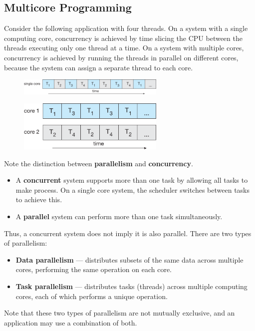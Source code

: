 \documentclass{article}
\begin{document}
\subsection{Multicore Programming}
Consider the following application with four threads. On a system with
a single computing core, concurrency is achieved by time slicing the
CPU between the threads executing only one thread at a time. On a
system with multiple cores, concurrency is achieved by running the
threads in parallel on different cores, because the system can assign a
separate thread to each core.
\begin{figure}[H]
    \centering
    \includegraphics[width = 7cm]{figures/threads_single_core.pdf}
\end{figure}
\begin{figure}[H]
    \centering
    \includegraphics[width = 7cm]{figures/threads_multi_core.pdf}
\end{figure}
Note the distinction between \textbf{parallelism} and \textbf{concurrency}.
\begin{itemize}
    \item A \textbf{concurrent} system supports more than one task by
          allowing all tasks to make process. On a single core system,
          the scheduler switches between tasks to achieve this.
    \item A \textbf{parallel} system can perform more than one task
          simultaneously.
\end{itemize}
Thus, a concurrent system does not imply it is also parallel.
There are two types of parallelism:
\begin{itemize}
    \item \textbf{Data parallelism} --- distributes subsets of the same
          data across multiple cores, performing the same operation on
          each core.
    \item \textbf{Task parallelism} --- distributes tasks (threads)
          across multiple computing cores, each of which performs a
          unique operation.
\end{itemize}
Note that these two types of parallelism are not mutually exclusive, and
an application may use a combination of both.
\end{document}
